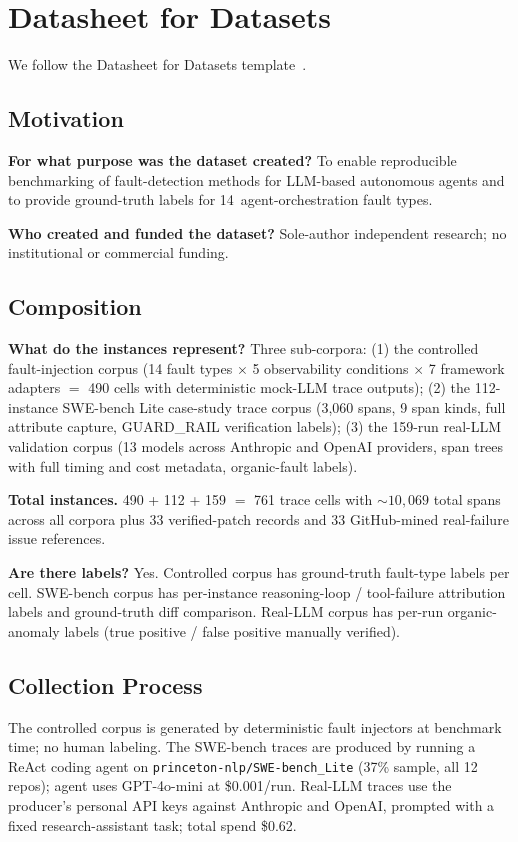 \documentclass{article}
\begin{document}
\section{Datasheet for Datasets}
\label{sec:datasheet}

We follow the Datasheet for Datasets template~\citep{datasheets}.

\subsection*{Motivation}
\textbf{For what purpose was the dataset created?}
To enable reproducible benchmarking of fault-detection methods for
LLM-based autonomous agents and to provide ground-truth labels for
14~agent-orchestration fault types.

\textbf{Who created and funded the dataset?}
Sole-author independent research; no institutional or commercial
funding.

\subsection*{Composition}
\textbf{What do the instances represent?}
Three sub-corpora: (1) the controlled fault-injection corpus (14
fault types $\times$ 5 observability conditions $\times$ 7 framework
adapters $=$ 490 cells with deterministic mock-LLM trace outputs);
(2) the 112-instance SWE-bench Lite case-study trace corpus
(3{,}060 spans, 9 span kinds, full attribute capture, GUARD\_RAIL
verification labels); (3) the 159-run real-LLM validation corpus
(13 models across Anthropic and OpenAI providers, span trees with
full timing and cost metadata, organic-fault labels).

\textbf{Total instances.} 490 + 112 + 159 $=$ 761 trace cells with
$\sim{}10{,}069$ total spans across all corpora plus 33 verified-patch
records and 33 GitHub-mined real-failure issue references.

\textbf{Are there labels?}
Yes.  Controlled corpus has ground-truth fault-type labels per cell.
SWE-bench corpus has per-instance reasoning-loop / tool-failure
attribution labels and ground-truth diff comparison.  Real-LLM corpus
has per-run organic-anomaly labels (true positive / false positive
manually verified).

\subsection*{Collection Process}
The controlled corpus is generated by deterministic fault injectors at
benchmark time; no human labeling.  The SWE-bench traces are produced
by running a ReAct coding agent on
\texttt{princeton-nlp/SWE-bench\_Lite} (37\% sample, all 12 repos);
agent uses GPT-4o-mini at \$0.001/run.  Real-LLM traces use the
producer's personal API keys against Anthropic and OpenAI, prompted
with a fixed research-assistant task; total spend \$0.62.
\end{document}
